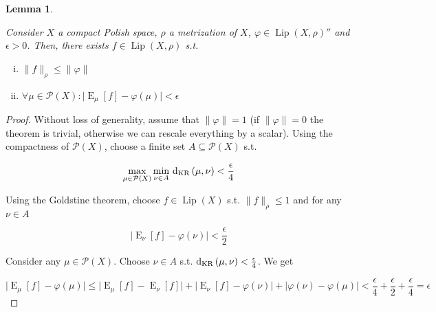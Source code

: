 \documentclass[aop,preprint]{imsart}
\numberwithin{equation}{section}
\theoremstyle{definition}
\theoremstyle{plain}
\newtheorem{lemma}{Lemma}[section]
\newcommand{\A}[1]{\lvert #1 \rvert}
\newcommand{\N}[1]{\lVert #1 \rVert}
\DeclareMathOperator{\E}{E}
\newcommand{\PM}{\mathcal{P}}
\newcommand{\Lp}{{\operatorname{Lip}}}
\newcommand{\DKR}{\operatorname{d}_{\textnormal{KR}}}
\begin{document}
\begin{samepage}
\begin{lemma}
\label{lmm:double_dual}

Consider $X$ a compact Polish space, $\rho$ a metrization of $X$, $\varphi \in \Lp\left(X,\rho\right)''$ and $\epsilon > 0$. Then, there exists $f \in \Lp\left(X,\rho\right)$ s.t.

\begin{enumerate}[i.]

\item $\N{f}_\rho \leq \N{\varphi}$
\item $\forall \mu \in \PM\left(X\right): \A{\E_\mu\left[f\right] - \varphi\left(\mu\right)} < \epsilon$

\end{enumerate}

\end{lemma}
\end{samepage}

\begin{proof}

Without loss of generality, assume that $\N{\varphi}=1$ (if $\N{\varphi}=0$ the theorem is trivial, otherwise we can rescale everything by a scalar). Using the compactness of $\PM\left(X\right)$, choose a finite set $A \subseteq \PM\left(X\right)$ s.t. 

$$\max_{\mu \in \PM\left(X\right)} \min_{\nu \in A}\, \DKR\left(\mu,\nu\right) < \frac{\epsilon}{4}$$

Using the Goldstine theorem, choose $f \in \Lp\left(X\right)$ s.t. $\N{f}_\rho \leq 1$ and for any $\nu \in A$ 

$$\A{\E_\nu\left[f\right] - \varphi\left(\nu\right)} < \frac{\epsilon}{2}$$

Consider any $\mu \in \PM\left(X\right)$. Choose $\nu \in A$ s.t. $\DKR\left(\mu,\nu\right) < \frac{\epsilon}{4}$. We get

$$\A{\E_\mu\left[f\right] - \varphi\left(\mu\right)} \leq \A{\E_\mu\left[f\right] - \E_\nu\left[f\right]} + \A{\E_\nu\left[f\right] - \varphi\left(\nu\right)} + \A{\varphi\left(\nu\right) - \varphi\left(\mu\right)} < \frac{\epsilon}{4} + \frac{\epsilon}{2} + \frac{\epsilon}{4} = \epsilon$$
\end{proof}
\end{document}
